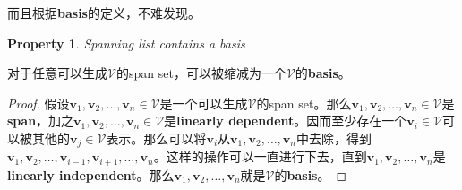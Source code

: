 \documentclass{report}
\def\V{\mathcal{V}}
\def\v{\mathbf{v}}
\newtheorem{property}{Property}[chapter]
\newcommand{\proptitle}[1]{\begin{property}  #1 \end{property}}
\newcommand{\propb}[1]{\begin{tcolorbox} [colback=red!10, colframe=red!60, sharp corners, leftrule={3pt}, rightrule={0pt}, toprule={0pt}, bottomrule={0pt}, left={2pt}, right={2pt}, top={3pt}, bottom={3pt}]\proptitle{#1}}
\def\prope{\end{tcolorbox}}
\begin{document}
而且根据\textbf{basis}的定义，不难发现。

\propb{Spanning list contains a basis}

对于任意可以生成$\V$的span set，可以被缩减为一个$\V$的\textbf{basis}。

\prope

\begin{proof}
	
	假设$\v_1,\v_2,\dots,\v_n \in \V$是一个可以生成$\V$的span set。那么$\v_1,\v_2,\dots,\v_n \in \V$是\textbf{span}，加之$\v_1,\v_2,\dots,\v_n \in \V$是\textbf{linearly dependent}。因而至少存在一个$\v_i \in \V$可以被其他的$\v_j \in \V$表示。那么可以将$\v_i$从$\v_1,\v_2,\dots,\v_n$中去除，得到$\v_1,\v_2,\dots,\v_{i-1},\v_{i+1},\dots,\v_n$。这样的操作可以一直进行下去，直到$\v_1,\v_2,\dots,\v_n$是\textbf{linearly independent}。那么$\v_1,\v_2,\dots,\v_n$就是$\V$的\textbf{basis}。
\end{proof}
\end{document}
